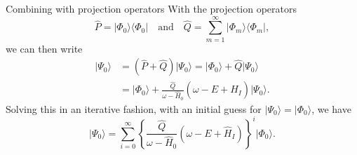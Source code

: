 \documentclass[UKenglish,aspectratio=169]{beamer}
\begin{document}
\begin{frame}{Combining with projection operators}
    With the projection operators
    \begin{equation}
        \hat{P} = \lvert \Phi_0 \rangle \langle \Phi_0 \rvert
        \quad \text{and} \quad
        \hat{Q} = \sum_{m = 1}^\infty \lvert \Phi_m \rangle \langle \Phi_m \rvert,
    \end{equation}
    we can then write
    \begin{equation}
        \begin{split}
            \lvert \Psi_0 \rangle
            &= \left( \hat{P} + \hat{Q} \right) \lvert \Psi_0 \rangle
            = \vert \Phi_0 \rangle + \hat{Q} \lvert \Psi_0 \rangle \\
            &= \vert \Phi_0 \rangle + \frac{\hat{Q}}{\omega - \hat{H}_0} \left( \omega - E + \hat{H}_I \right) \lvert \Psi_0 \rangle.
        \end{split}
    \end{equation}
    Solving this in an iterative fashion, with an initial guess for $\lvert \Psi_0 \rangle = \lvert \Phi_0 \rangle$, we have
    \begin{equation}
        \vert \Psi_0 \rangle = \sum_{i = 0}^\infty \left\{
            \frac{\hat{Q}}{\omega - \hat{H}_0} \left( \omega - E + \hat{H}_I \right)
        \right\}^{i} \lvert \Phi_0 \rangle.
    \end{equation}
\end{frame}

\end{document}
